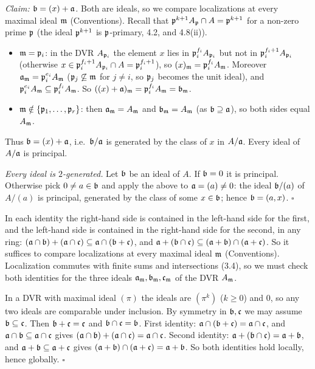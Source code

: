 \documentclass[11pt]{article}
\begin{document}
\emph{Claim: $\mathfrak b=(x)+\mathfrak a$.} Both are ideals, so we compare localizations at every maximal ideal $\mathfrak m$ (Conventions). Recall that $\mathfrak p^{k+1}A_\mathfrak p\cap A=\mathfrak p^{k+1}$ for a non-zero prime $\mathfrak p$ (the ideal $\mathfrak p^{k+1}$ is $\mathfrak p$-primary, 4.2, and 4.8(ii)).
\begin{itemize}[leftmargin=*]
\item $\mathfrak m=\mathfrak p_i$: in the DVR $A_{\mathfrak p_i}$ the element $x$ lies in $\mathfrak p_i^{f_i}A_{\mathfrak p_i}$ but not in $\mathfrak p_i^{f_i+1}A_{\mathfrak p_i}$ (otherwise $x\in\mathfrak p_i^{f_i+1}A_{\mathfrak p_i}\cap A=\mathfrak p_i^{f_i+1}$), so $(x)_{\mathfrak m}=\mathfrak p_i^{f_i}A_{\mathfrak m}$. Moreover $\mathfrak a_{\mathfrak m}=\mathfrak p_i^{e_i}A_\mathfrak m$ ($\mathfrak p_j\not\subseteq\mathfrak m$ for $j\ne i$, so $\mathfrak p_j$ becomes the unit ideal), and $\mathfrak p_i^{e_i}A_\mathfrak m\subseteq\mathfrak p_i^{f_i}A_\mathfrak m$. So $((x)+\mathfrak a)_\mathfrak m=\mathfrak p_i^{f_i}A_\mathfrak m=\mathfrak b_\mathfrak m$.
\item $\mathfrak m\notin\{\mathfrak p_1,\dots,\mathfrak p_r\}$: then $\mathfrak a_\mathfrak m=A_\mathfrak m$ and $\mathfrak b_\mathfrak m=A_\mathfrak m$ (as $\mathfrak b\supseteq\mathfrak a$), so both sides equal $A_\mathfrak m$.
\end{itemize}
Thus $\mathfrak b=(x)+\mathfrak a$, i.e.\ $\mathfrak b/\mathfrak a$ is generated by the class of $x$ in $A/\mathfrak a$. Every ideal of $A/\mathfrak a$ is principal.

\emph{Every ideal is $2$-generated.} Let $\mathfrak b$ be an ideal of $A$. If $\mathfrak b=0$ it is principal. Otherwise pick $0\ne a\in\mathfrak b$ and apply the above to $\mathfrak a=(a)\ne0$: the ideal $\mathfrak b/(a)$ of $A/(a)$ is principal, generated by the class of some $x\in\mathfrak b$; hence $\mathfrak b=(a,x)$. \hfill$\square$

\pf
In each identity the right-hand side is contained in the left-hand side for the first, and the left-hand side is contained in the right-hand side for the second, in any ring: $(\mathfrak a\cap\mathfrak b)+(\mathfrak a\cap\mathfrak c)\subseteq\mathfrak a\cap(\mathfrak b+\mathfrak c)$, and $\mathfrak a+(\mathfrak b\cap\mathfrak c)\subseteq(\mathfrak a+\mathfrak b)\cap(\mathfrak a+\mathfrak c)$. So it suffices to compare localizations at every maximal ideal $\mathfrak m$ (Conventions). Localization commutes with finite sums and intersections (3.4), so we must check both identities for the three ideals $\mathfrak a_\mathfrak m,\mathfrak b_\mathfrak m,\mathfrak c_\mathfrak m$ of the DVR $A_\mathfrak m$.

In a DVR with maximal ideal $(\pi)$ the ideals are $(\pi^k)$ ($k\ge0$) and $0$, so any two ideals are comparable under inclusion. By symmetry in $\mathfrak b,\mathfrak c$ we may assume $\mathfrak b\subseteq\mathfrak c$. Then $\mathfrak b+\mathfrak c=\mathfrak c$ and $\mathfrak b\cap\mathfrak c=\mathfrak b$. First identity: $\mathfrak a\cap(\mathfrak b+\mathfrak c)=\mathfrak a\cap\mathfrak c$, and $\mathfrak a\cap\mathfrak b\subseteq\mathfrak a\cap\mathfrak c$ gives $(\mathfrak a\cap\mathfrak b)+(\mathfrak a\cap\mathfrak c)=\mathfrak a\cap\mathfrak c$. Second identity: $\mathfrak a+(\mathfrak b\cap\mathfrak c)=\mathfrak a+\mathfrak b$, and $\mathfrak a+\mathfrak b\subseteq\mathfrak a+\mathfrak c$ gives $(\mathfrak a+\mathfrak b)\cap(\mathfrak a+\mathfrak c)=\mathfrak a+\mathfrak b$. So both identities hold locally, hence globally. \hfill$\square$
\end{document}
